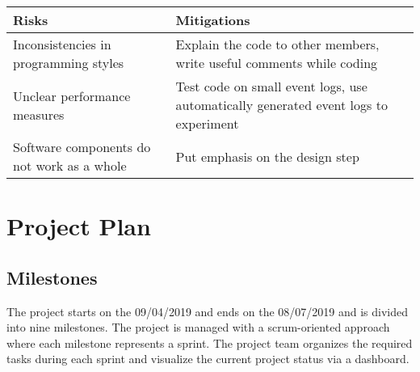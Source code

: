 \documentclass[notitlepage]{article}
\begin{document}
\begin{flushleft}
\begin{tabularx}{12cm}{|X|X|}
\hline
\textbf{Risks} &\textbf{Mitigations}\\
\hline
Inconsistencies in programming styles & Explain the code to other members, write useful comments while coding\\
\hline
Unclear performance measures & Test code on small event logs, use automatically generated event logs to experiment \\
\hline
Software components do not work as a whole & Put emphasis on the design step \\ 
\hline
\end{tabularx}






\section{Project Plan}

\subsection{Milestones}

The project starts on the 09/04/2019 and ends on the 08/07/2019 and is divided into nine milestones. The project is managed with a scrum-oriented approach
where each milestone represents a sprint. The project team organizes the required tasks during each sprint and visualize the current project status via a dashboard.


\end{flushleft}
\end{document}
